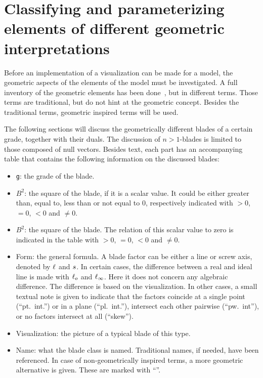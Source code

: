 \section{Classifying and parameterizing elements of different geometric interpretations}
\label{ch:research}

Before an implementation of a visualization can be made for a model, the geometric aspects of the elements of the model must be investigated.  A full inventory of the geometric elements has been done~\cite[Chapter 3]{Pottmann}, but in different terms.  Those terms are traditional, but do not hint at the geometric concept.  Besides the traditional terms, geometric inspired terms will be used.  

The following sections will discuss the geometrically different blades of a certain grade, together with their duals.  The discussion of $n>1$-blades is limited to those composed of null vectors.  Besides text, each part has an accompanying table that contains the following information on the discussed blades:
\begin{itemize}
  \item \texttt{g}: the grade of the blade.
  \item $B^2$: the square of the blade, if it is a scalar value.  It could be either greater than, equal to, less than or not equal to 0, respectively indicated with $> 0$, $= 0$, $< 0$ and $\not= 0$.
  \item $B^2$: the square of the blade.  The relation of this scalar value to zero is indicated in the table with $> 0$, $= 0$, $< 0$ and $\not= 0$.
  \item Form: the general formula.  A blade factor can be either a line or screw axis, denoted by $\ell$ and $s$.  In certain cases, the difference between a real and ideal line is made with $\ell_o$ and $\ell_\infty$.  Here it does not concern any algebraic difference.  The difference is based on the visualization.  In other cases, a small textual note is given to indicate that the factors coincide at a single point (``pt.\ int.'') or in a plane (``pl.\ int.''), intersect each other pairwise (``pw.\ int''), or no factors intersect at all (``skew'').
  \item Visualization: the picture of a typical blade of this type.
  \item Name: what the blade class is named.  Traditional names, if needed, have been referenced.  In case of non-geometrically inspired terms, a more geometric alternative is given.  These are marked with ``\newterm''.
\end{itemize}


